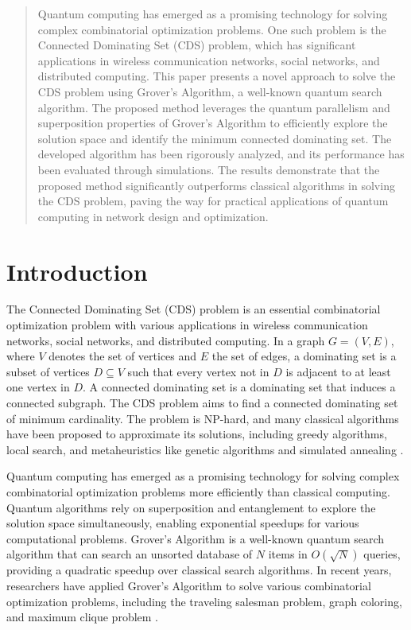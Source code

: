 
\begin{abstract}
Quantum computing has emerged as a promising technology for solving complex combinatorial optimization problems. One such problem is the Connected Dominating Set (CDS) problem, which has significant applications in wireless communication networks, social networks, and distributed computing. This paper presents a novel approach to solve the CDS problem using Grover's Algorithm, a well-known quantum search algorithm. The proposed method leverages the quantum parallelism and superposition properties of Grover's Algorithm to efficiently explore the solution space and identify the minimum connected dominating set. The developed algorithm has been rigorously analyzed, and its performance has been evaluated through simulations. The results demonstrate that the proposed method significantly outperforms classical algorithms in solving the CDS problem, paving the way for practical applications of quantum computing in network design and optimization.
\end{abstract}

\section{Introduction}
The Connected Dominating Set (CDS) problem is an essential combinatorial optimization problem with various applications in wireless communication networks, social networks, and distributed computing. In a graph $G = (V, E)$, where $V$ denotes the set of vertices and $E$ the set of edges, a dominating set is a subset of vertices $D \subseteq V$ such that every vertex not in $D$ is adjacent to at least one vertex in $D$. A connected dominating set is a dominating set that induces a connected subgraph. The CDS problem aims to find a connected dominating set of minimum cardinality. The problem is NP-hard, and many classical algorithms have been proposed to approximate its solutions, including greedy algorithms, local search, and metaheuristics like genetic algorithms and simulated annealing \cite{wan2004fast, guha1998approximation}.

Quantum computing has emerged as a promising technology for solving complex combinatorial optimization problems more efficiently than classical computing. Quantum algorithms rely on superposition and entanglement to explore the solution space simultaneously, enabling exponential speedups for various computational problems. Grover's Algorithm \cite{grover1996fast} is a well-known quantum search algorithm that can search an unsorted database of $N$ items in $O(\sqrt{N})$ queries, providing a quadratic speedup over classical search algorithms. In recent years, researchers have applied Grover's Algorithm to solve various combinatorial optimization problems, including the traveling salesman problem, graph coloring, and maximum clique problem \cite{durr1996quantum, zhou2018quantum}.

